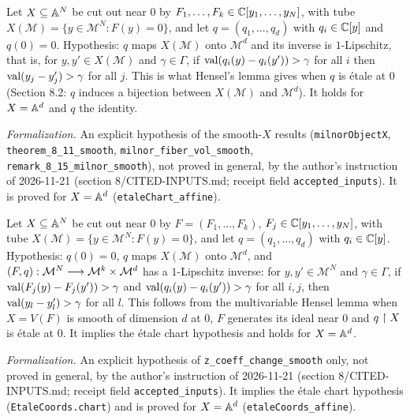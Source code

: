 \begin{assumption}
\label{hyp-etale-chart}
\leanok
Let $X \subseteq \mathbb{A}^N$ be cut out near $0$ by $F_1, \ldots, F_k \in \mathbb{C}[y_1, \ldots, y_N]$, with tube $X(\mathcal M) = \{y \in \mathcal M^N : F(y) = 0\}$, and let $q = (q_1, \ldots, q_d)$ with $q_i \in \mathbb{C}[y]$ and $q(0) = 0$. Hypothesis: $q$ maps $X(\mathcal M)$ onto $\mathcal M^d$ and its inverse is $1$-Lipschitz, that is, for $y, y' \in X(\mathcal M)$ and $\gamma \in \Gamma$, if $\operatorname{val}(q_i(y) - q_i(y')) > \gamma$ for all $i$ then $\operatorname{val}(y_j - y'_j) > \gamma$ for all $j$. This is what Hensel's lemma gives when $q$ is \'etale at $0$ (Section 8.2: $q$ induces a bijection between $X(\mathcal M)$ and $\mathcal M^d$). It holds for $X = \mathbb{A}^d$ and $q$ the identity.

\emph{Formalization.} An explicit hypothesis of the smooth-$X$ results (\texttt{milnorObjectX}, \texttt{theorem\_8\_11\_smooth}, \texttt{milnor\_fiber\_vol\_smooth}, \texttt{remark\_8\_15\_milnor\_smooth}), not proved in general, by the author's instruction of 2026-11-21 (section 8/CITED-INPUTS.md; receipt field \texttt{accepted\_inputs}). It is proved for $X = \mathbb{A}^d$ (\texttt{etaleChart\_affine}).
\end{assumption}

\begin{assumption}
\label{hyp-etale-coords}
\leanok
Let $X \subseteq \mathbb{A}^N$ be cut out near $0$ by $F = (F_1, \ldots, F_k)$, $F_j \in \mathbb{C}[y_1, \ldots, y_N]$, with tube $X(\mathcal M) = \{y \in \mathcal M^N : F(y) = 0\}$, and let $q = (q_1, \ldots, q_d)$ with $q_i \in \mathbb{C}[y]$. Hypothesis: $q(0) = 0$, $q$ maps $X(\mathcal M)$ onto $\mathcal M^d$, and $(F, q) : \mathcal M^N \longrightarrow \mathcal M^k \times \mathcal M^d$ has a $1$-Lipschitz inverse: for $y, y' \in \mathcal M^N$ and $\gamma \in \Gamma$, if $\operatorname{val}(F_j(y) - F_j(y')) > \gamma$ and $\operatorname{val}(q_i(y) - q_i(y')) > \gamma$ for all $i, j$, then $\operatorname{val}(y_l - y'_l) > \gamma$ for all $l$. This follows from the multivariable Hensel lemma when $X = V(F)$ is smooth of dimension $d$ at $0$, $F$ generates its ideal near $0$ and $q \upharpoonright X$ is \'etale at $0$. It implies the \'etale chart hypothesis and holds for $X = \mathbb{A}^d$.

\emph{Formalization.} An explicit hypothesis of \texttt{z\_coeff\_change\_smooth} only, not proved in general, by the author's instruction of 2026-11-21 (section 8/CITED-INPUTS.md; receipt field \texttt{accepted\_inputs}). It implies the \'etale chart hypothesis (\texttt{EtaleCoords.chart}) and is proved for $X = \mathbb{A}^d$ (\texttt{etaleCoords\_affine}).
\end{assumption}

